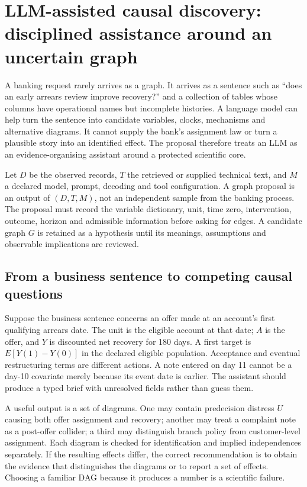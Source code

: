 \chapter{LLM-assisted causal discovery: disciplined assistance around an uncertain graph}
\label{ch:llm-causal-discovery-l4}

A banking request rarely arrives as a graph. It arrives as a sentence such as ``does an early arrears review improve recovery?'' and a collection of tables whose columns have operational names but incomplete histories. A language model can help turn the sentence into candidate variables, clocks, mechanisms and alternative diagrams. It cannot supply the bank's assignment law or turn a plausible story into an identified effect. The proposal therefore treats an LLM as an evidence-organising assistant around a protected scientific core.

Let $D$ be the observed records, $T$ the retrieved or supplied technical text, and $M$ a declared model, prompt, decoding and tool configuration. A graph proposal is an output of $(D,T,M)$, not an independent sample from the banking process. The proposal must record the variable dictionary, unit, time zero, intervention, outcome, horizon and admissible information before asking for edges. A candidate graph $G$ is retained as a hypothesis until its meanings, assumptions and observable implications are reviewed.

\section{From a business sentence to competing causal questions}

Suppose the business sentence concerns an offer made at an account's first qualifying arrears date. The unit is the eligible account at that date; $A$ is the offer, and $Y$ is discounted net recovery for 180 days. A first target is $E[Y(1)-Y(0)]$ in the declared eligible population. Acceptance and eventual restructuring terms are different actions. A note entered on day 11 cannot be a day-10 covariate merely because its event date is earlier. The assistant should produce a typed brief with unresolved fields rather than guess them.

A useful output is a set of diagrams. One may contain predecision distress $U$ causing both offer assignment and recovery; another may treat a complaint note as a post-offer collider; a third may distinguish branch policy from customer-level assignment. Each diagram is checked for identification and implied independences separately. If the resulting effects differ, the correct recommendation is to obtain the evidence that distinguishes the diagrams or to report a set of effects. Choosing a familiar DAG because it produces a number is a scientific failure.

